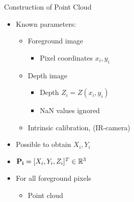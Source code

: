 
\begin{frame}{Construction of Point Cloud}

	\begin{itemize}
	\item Known parameters:
	\begin{itemize}
	\item Foreground image
	\begin{itemize}
		\item Pixel coordinates $x_i,y_i$
	\end{itemize}
	\item Depth image
	\begin{itemize}
		\item Depth $Z_i = Z(x_i,y_i)$ 
		\item NaN values ignored
	\end{itemize}
	\item Intrinsic calibration, (IR-camera)
	\end{itemize}
	\item Possible to obtain $X_i,Y_i$
	\item ${\bf P_i} = [X_i, Y_i, Z_i]^T \in \mathbb{R}^3$
	\item For all foreground pixels
	\begin{itemize}
	\item Point cloud
	\end{itemize}

	\end{itemize}
\end{frame}
